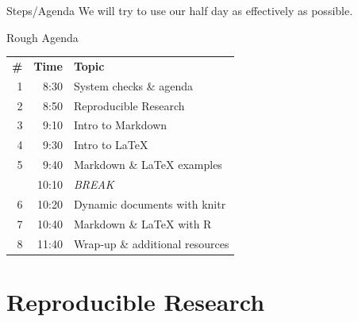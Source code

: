 \documentclass{beamer}
\begin{document}
\begin{frame}{Steps/Agenda}
\vfill
We will try to use our half day as effectively as possible.
\begin{exampleblock}{Rough Agenda}
\begin{center}
\begin{tabular}{r|r|l}
    \textbf{\#} & \textbf{Time} & \textbf{Topic} \\
    1 & 8:30 & System checks \& agenda \\
    2 & 8:50 & Reproducible Research \\
    3 & 9:10 & Intro to Markdown \\
    4 & 9:30 & Intro to LaTeX \\
    5 & 9:40 & Markdown \& LaTeX examples \\
    \hline
     & 10:10 & \emph{BREAK} \\
    \hline
    6 & 10:20 & Dynamic documents with knitr \\
    7 & 10:40 & Markdown \& LaTeX with R \\
    8 & 11:40 & Wrap-up \& additional resources
\end{tabular}
\end{center}
\end{exampleblock}
\end{frame}

\section{Reproducible Research}
\end{document}
